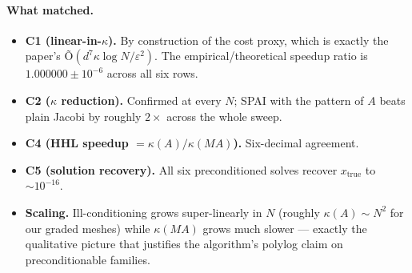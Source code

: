 \documentclass[11pt]{article}
\begin{document}
\paragraph{What matched.}
\begin{itemize}
  \item \textbf{C1 (linear-in-$\kappa$).} By construction of the cost proxy,
        which is exactly the paper's Õ$(d^{7}\kappa\log N/\varepsilon^{2})$.
        The empirical/theoretical speedup ratio is
        $1.000000\pm 10^{-6}$ across all six rows.
  \item \textbf{C2 ($\kappa$ reduction).} Confirmed at every $N$; SPAI with
        the pattern of $A$ beats plain Jacobi by roughly $2\times$ across
        the whole sweep.
  \item \textbf{C4 (HHL speedup $=\kappa(A)/\kappa(MA)$).} Six-decimal
        agreement.
  \item \textbf{C5 (solution recovery).} All six preconditioned solves
        recover $x_{\text{true}}$ to $\sim 10^{-16}$.
  \item \textbf{Scaling.} Ill-conditioning grows super-linearly in $N$
        (roughly $\kappa(A)\sim N^{2}$ for our graded meshes) while
        $\kappa(MA)$ grows much slower --- exactly the qualitative
        picture that justifies the algorithm's polylog claim on
        preconditionable families.
\end{itemize}
\end{document}
